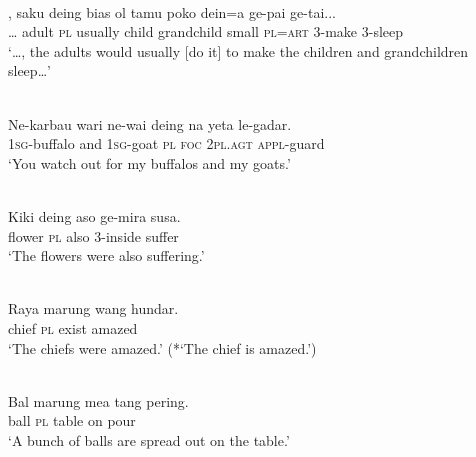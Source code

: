 \ea%
\label{ex:9:3}
 \\
\gll  {\dots}, saku deing bias ol tamu poko dein=a ge-pai ge-tai...\\
  {\dots} adult \textsc{pl} usually child grandchild small \textsc{pl=art} \textsc{3-}make 3-sleep\\
\glt `{\dots}, the adults would usually [do it] to make the children and grandchildren sleep{\dots}'
\z








\ea%
\label{ex:9:4}
 \\
\gll Ne-karbau wari ne-wai deing na yeta le-gadar.{\footnotemark}\\
  \textsc{1sg}\textsc{-}buffalo and \textsc{1sg-}goat \textsc{pl} \textsc{foc} \textsc{2pl.agt} \textsc{appl-}guard\\
\glt `You watch out for my buffalos and my goats.' 
\z
{}







\ea%
\label{ex:9:5}
 \\
\gll Kiki deing aso ge-mira susa. \\
  flower \textsc{pl} also 3-inside suffer  \\
\glt `The flowers were also suffering.'
 \z








\ea%
\label{ex:9:6}
 \\
\gll  Raya marung wang hundar. \\
   chief \textsc{pl} exist amazed  \\
\glt `The chiefs were amazed.' (*`The chief is amazed.')
\z







\ea%
\label{ex:9:7}
 \\
\gll Bal  marung mea tang pering.  \\
  ball \textsc{pl} table on pour   \\
\glt `A bunch of balls are spread out on the table.'
\z







